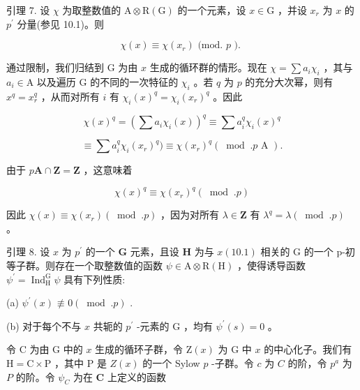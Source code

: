 \documentclass[10pt]{article}
\begin{document}
引理 7. 设 \(\chi\) 为取整数值的 \(\mathrm{A} \otimes  \mathrm{R}\left( \mathrm{G}\right)\) 的一个元素，设 \(x \in  \mathrm{G}\) ，并设 \({x}_{r}\) 为 \(x\) 的 \({p}^{\prime }\) 分量(参见 10.1)。则

\[
\chi \left( x\right)  \equiv  \chi \left( {x}_{r}\right) \text{ (mod. }p\text{ ). }
\]

通过限制，我们归结到 G 为由 \(x\) 生成的循环群的情形。现在 \(\chi  = \sum {a}_{i}{\chi }_{i}\) ，其与 \({a}_{i} \in  \mathrm{A}\) 以及遍历 G 的不同的一次特征的 \({\chi }_{i}\) 。若 \(q\) 为 \(p\) 的充分大次幂，则有 \({x}^{q} = {x}_{r}^{q}\) ，从而对所有 \(i\) 有 \({\chi }_{i}{\left( x\right) }^{q} = {\chi }_{i}{\left( {x}_{r}\right) }^{q}\) 。因此

\[
\chi {\left( x\right) }^{q} = {\left( \sum {a}_{i}{\chi }_{i}\left( x\right) \right) }^{q} \equiv  \sum {a}_{i}^{q}{\chi }_{i}{\left( x\right) }^{q}
\]

\[
\equiv  \sum {a}_{i}^{q}{\chi }_{i}{\left( {x}_{r}\right) }^{q}) \equiv  \chi {\left( {x}_{r}\right) }^{q}\left( {{\;\operatorname{mod}\;.}p\text{ A }}\right) .
\]

由于 \(p\mathbf{A} \cap  \mathbf{Z} = \mathbf{Z}\) ，这意味着

\[
\chi {\left( x\right) }^{q} \equiv  \chi {\left( {x}_{r}\right) }^{q}\left( {\;\operatorname{mod}\;.p}\right)
\]

因此 \(\chi \left( x\right)  \equiv  \chi \left( {x}_{r}\right) \left( {{\;\operatorname{mod}\;.}p}\right)\) ，因为对所有 \(\lambda  \in  \mathbf{Z}\) 有 \({\lambda }^{q} = \lambda \left( {{\;\operatorname{mod}\;.}p}\right)\) 。

引理 8. 设 \(x\) 为 \({p}^{\prime }\) 的一个 \(\mathbf{G}\) 元素，且设 \(\mathbf{H}\) 为与 \(x\left( {10.1}\right)\) 相关的 \(\mathrm{G}\) 的一个 p-初等子群。则存在一个取整数值的函数 \(\psi  \in  \mathrm{A} \otimes  \mathrm{R}\left( \mathrm{H}\right)\) ，使得诱导函数 \({\psi }^{\prime } = {\operatorname{Ind}}_{\mathrm{H}}^{\mathrm{G}}\psi\) 具有下列性质:

(a) \({\psi }^{\prime }\left( x\right)  \text{ ≢ } 0\left( {\;\operatorname{mod}\;.p}\right)\) .

(b) 对于每个不与 \(x\) 共轭的 \({p}^{\prime }\) -元素的 \(\mathrm{G}\) ，均有 \({\psi }^{\prime }\left( s\right)  = 0\) 。

令 \(\mathrm{C}\) 为由 \(\mathrm{G}\) 中的 \(x\) 生成的循环子群，令 \(\mathrm{Z}\left( x\right)\) 为 \(\mathrm{G}\) 中 \(x\) 的中心化子。我们有 \(\mathrm{H} = \mathrm{C} \times  \mathrm{P}\) ，其中 \(\mathrm{P}\) 是 \(Z\left( x\right)\) 的一个 Sylow \(p\) -子群。令 \(c\) 为 \(C\) 的阶，令 \({p}^{a}\) 为 \(P\) 的阶。令 \({\psi }_{C}\) 为在 \(\mathbf{C}\) 上定义的函数
\end{document}
